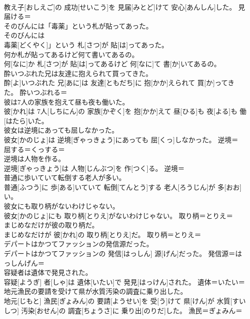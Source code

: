 \documentclass[8pt]{extreport}
\begin{document}
\begin{CJK}{UTF8}{min}
\\	教え子[おしえご]の 成功[せいこう]を 見届[みとど]けて 安心[あんしん]した。	見届ける＝ 
\\	そのびんには「毒薬」という札が貼ってあった。	
\\	そのびんには
\\	毒薬[どくやく]」という 札[さつ]が 貼[は]ってあった。	
\\	何か札が貼ってあるけど何て書いてあるの。	
\\	何[なに]か 札[さつ]が 貼[は]ってあるけど 何[なに]て 書[か]いてあるの。	
\\	酔いつぶれた兄は友達に抱えられて買ってきた。	
\\	酔[よ]いつぶれた 兄[あに]は 友達[ともだち]に 抱[かか]えられて 買[か]ってきた。	酔いつぶれる＝ 
\\	彼は7人の家族を抱えて昼も夜も働いた。	
\\	彼[かれ]は 7人[しちにん]の 家族[かぞく]を 抱[かか]えて 昼[ひる]も 夜[よる]も 働[はたら]いた。	
\\	彼女は逆境にあっても屈しなかった。	
\\	彼女[かのじょ]は 逆境[ぎゃっきょう]にあっても 屈[くっ]しなかった。	逆境＝ 
\\	屈する＝くっする＝ 
\\	逆境は人物を作る。	
\\	逆境[ぎゃっきょう]は 人物[じんぶつ]を 作[つく]る。	逆境＝ 
\\	普通に歩いていて転倒する老人が多い。	
\\	普通[ふつう]に 歩[ある]いていて 転倒[てんとう]する 老人[ろうじん]が 多[おお]い。	
\\	彼女にも取り柄がないわけじゃない。	
\\	彼女[かのじょ]にも 取り柄[とりえ]がないわけじゃない。	取り柄＝とりえ＝ 
\\	まじめなだけが彼の取り柄だ。	
\\	まじめなだけが 彼[かれ]の 取り柄[とりえ]だ。	取り柄＝とりえ＝ 
\\	デパートはかつてファッションの発信源だった。	
\\	デパートはかつてファッションの 発信[はっしん] 源[げん]だった。	発信源＝はっしんげん＝ 
\\	容疑者は遺体で発見された。	
\\	容疑[ようぎ] 者[しゃ]は 遺体[いたい]で 発見[はっけん]された。	遺体＝いたい＝ 
\\	地元漁民の要請を受けて県が水質汚染の調査に乗り出した。	
\\	地元[じもと] 漁民[ぎょみん]の 要請[ようせい]を 受[う]けて 県[けん]が 水質[すいしつ] 汚染[おせん]の 調査[ちょうさ]に 乗り出[のりだ]した。	漁民＝ぎょみん＝ 

\end{CJK}
\end{document}
